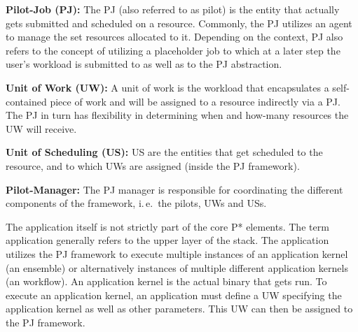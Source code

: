 \documentclass[conference,final]{IEEEtran}
\newcommand{\jhanote}[1]{ {\textcolor{red} { ***shantenu: #1 }}}
\newcommand{\alnote}[1]{ {\textcolor{blue} { ***andre: #1 }}}
\newcommand{\alnote}[1]{}
\newcommand{\jhanote}[1]{}
\begin{document}
\begin{compactitem}
\item \textbf{Pilot-Job (PJ):} The PJ (also referred to as pilot) is
  the entity that actually gets submitted and scheduled on a resource.
  Commonly, the PJ utilizes an agent to manage the set resources 
  allocated to it. Depending on the context, PJ also refers to the concept
  of utilizing a placeholder job to which at a later step the user's
  workload is submitted to as well as to the PJ abstraction.

\item \textbf{Unit of Work (UW):} A unit of work is the workload that
  encapsulates a self-contained piece of work and will be assigned to
  a resource indirectly via a PJ.  The PJ in turn has
  flexibility in determining when and how-many resources the UW will
  receive.

\item \textbf{Unit of Scheduling (US):} US are the entities 
  that get scheduled to the resource, and to which UWs are assigned
  (inside the PJ framework). 
  



\item \textbf{Pilot-Manager:} The PJ manager is responsible for coordinating
	  the different components of the framework, i.\,e.\ the pilots, UWs and 
	  USs.
\end{compactitem}
The application itself is not strictly part of the core P* elements. The term
application generally refers to the upper layer of the stack. The application
utilizes the PJ framework to execute multiple instances of an application kernel
(an ensemble) or alternatively instances of multiple different application
kernels (an workflow). An application kernel is the actual binary that gets run.
To execute an application kernel, an application must define a UW specifying the
application kernel as well as other parameters. This UW can then be assigned to
the PJ framework.
	
\end{document}
